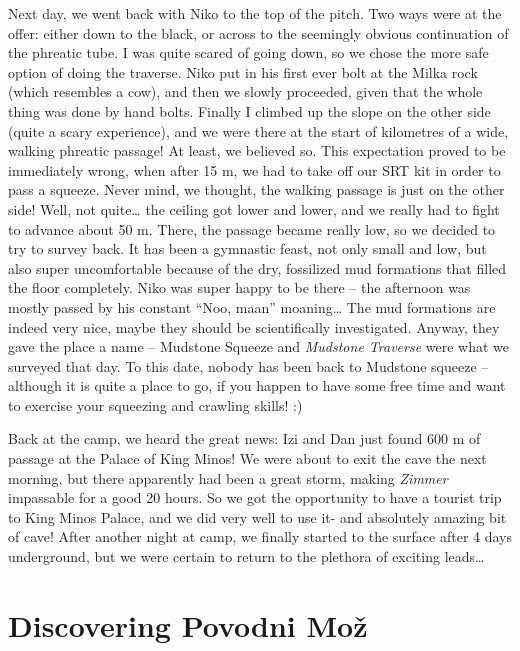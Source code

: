 Next day, we went back with Niko to the top of the pitch. Two ways were
at the offer: either down to the black, or across to the seemingly
obvious continuation of the phreatic tube. I was quite scared of going
down, so we chose the more safe option of doing the traverse. Niko put
in his first ever bolt at the Milka rock (which resembles a cow), and
then we slowly proceeded, given that the whole thing was done by hand
bolts. Finally I climbed up the slope on the other side (quite a scary
experience), and we were there at the start of kilometres of a wide,
walking phreatic passage! At least, we believed so. This expectation
proved to be immediately wrong, when after 15 m, we had to take off our
SRT kit in order to pass a squeeze. Never mind, we thought, the walking
passage is just on the other side! Well, not quite\ldots{} the ceiling
got lower and lower, and we really had to fight to advance about 50 m.
There, the passage became really low, so we decided to try to survey
back. It has been a gymnastic feast, not only small and low, but also
super uncomfortable because of the dry, fossilized mud formations that
filled the floor completely. Niko was super happy to be there -- the
afternoon was mostly passed by his constant ``Noo, maan''
moaning\ldots{} The mud formations are indeed very nice, maybe they
should be scientifically investigated. Anyway, they gave the place a
name -- Mudstone Squeeze and \emph{Mudstone Traverse} were what we
surveyed that day. To this date, nobody has been back to Mudstone
squeeze -- although it is quite a place to go, if you happen to have
some free time and want to exercise your squeezing and crawling skills!
:)

Back at the camp, we heard the great news: Izi and Dan just found 600 m
of passage at the Palace of King Minos! We were about to exit the cave
the next morning, but there apparently had been a great storm, making
\emph{Zimmer} impassable for a good 20 hours. So we got the opportunity
to have a tourist trip to King Minos Palace, and we did very well to use
it- and absolutely amazing bit of cave! After another night at camp, we
finally started to the surface after 4 days underground, but we were
certain to return to the plethora of exciting leads\ldots{}



\section{Discovering Povodni Mož}

